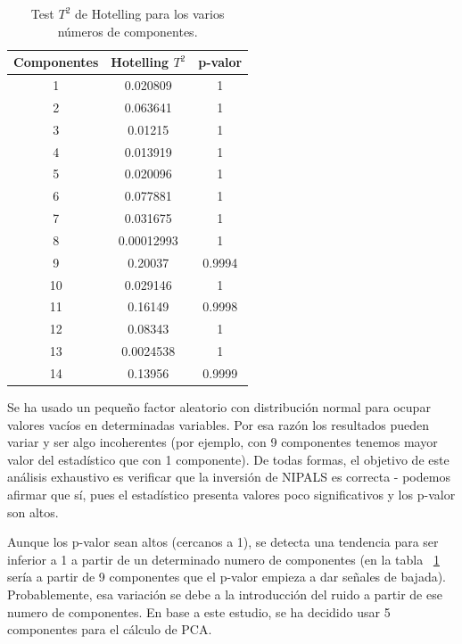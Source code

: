 \documentclass[11pt,spanish,listoffigures,listoftables]{tfgetsinf}
\begin{document}
    \begin{table}
         \centering
         \begin{tabular}{|c|c|c|} 
             \hline
             Componentes & Hotelling \(T^2\) & p-valor \\ [0.5ex] 
             \hline\hline
             1 & 0.020809 & 1 \\ 
             \hline
             2 & 0.063641 & 1 \\ 
             \hline
             3 & 0.01215 & 1 \\ 
             \hline
             4 & 0.013919 & 1 \\ 
             \hline
             5 & 0.020096 & 1 \\ 
             \hline
             6 & 0.077881 & 1 \\ 
             \hline
             7 & 0.031675 & 1 \\ 
             \hline
             8 & 0.00012993 & 1 \\ 
             \hline
             9 & 0.20037 & 0.9994 \\ 
             \hline
             10 & 0.029146 & 1 \\ 
             \hline
             11 & 0.16149 & 0.9998 \\ 
             \hline
             12 & 0.08343 & 1 \\ 
             \hline
             13 & 0.0024538 & 1 \\ 
             \hline
             14 & 0.13956 & 0.9999 \\ 
             \hline
        \end{tabular}
        \caption{Test \(T^2\) de Hotelling para los varios números de componentes.}
        \label{table:t2_test}
    \end{table}
    
    Se ha usado un pequeño factor aleatorio con distribución normal para ocupar valores vacíos en determinadas variables. Por esa razón los resultados pueden variar y ser algo incoherentes (por ejemplo, con 9 componentes tenemos mayor valor del estadístico que con 1 componente). De todas formas, el objetivo de este análisis exhaustivo es verificar que la inversión de NIPALS es correcta - podemos afirmar que sí, pues el estadístico presenta valores poco significativos y los p-valor son altos. 
    
    Aunque los p-valor sean altos (cercanos a 1), se detecta una tendencia para ser inferior a 1 a partir de un determinado numero de componentes (en la tabla ~\ref{table:t2_test} sería a partir de 9 componentes que el p-valor empieza a dar señales de bajada). Probablemente, esa variación se debe a la introducción del ruido a partir de ese numero de componentes. En base a este estudio, se ha decidido usar 5 componentes para el cálculo de PCA.
\end{document}

